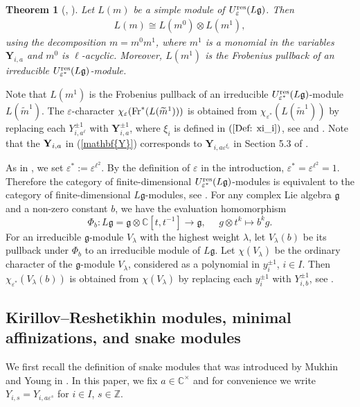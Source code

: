 \documentclass[11pt, reqno]{amsart}
\theoremstyle{plain}
\newtheorem{theorem}{Theorem}[section]
\theoremstyle{definition}
\numberwithin{equation}{section}
\newcommand{\CC}{{\mathbb {C}}}
\newcommand{\res}{{\rm res}}
\begin{document}
\begin{theorem}[{\cite[Theorem 9.1]{CP97}}, {\cite[Theorem 5.4]{FM02}}]\label{Th:decomposition}
Let $L(m)$ be a simple module of $U_\varepsilon^{\res}({L\mathfrak{g}})$. Then
\begin{align*}
L(m)\cong L(m^{0})\otimes L(m^{1}),
\end{align*}
using the decomposition $m=m^{0}m^{1}$, where $m^{1}$ is a monomial in the variables $\mathbf{Y}_{i,a}$ and $m^{0}$ is $\ell$-acyclic. Moreover, $L(m^1)$ is the Frobenius pullback of an irreducible $U_{{\varepsilon}^{\ast}}^{\res}({L\mathfrak{g}})$-module.
\end{theorem}
Note that $L(m^1)$ is the Frobenius pullback of an irreducible $U_{{\varepsilon}^{\ast}}^{\res}({L\mathfrak{g}})$-module $L(\widetilde{m}^1)$. The $\varepsilon$-character $\chi_{\varepsilon}({\rm Fr}^{\ast}(L(\widetilde{m}^1)))$ is obtained from $\chi_{\varepsilon^{\ast}}(L(\widetilde{m}^1))$ by replacing each $Y_{i,a^\ell}^{\pm 1}$ with $\mathbf{Y}_{i,a}^{\pm 1}$, where $\xi_i$ is defined in $(\ref{Def: xi_i})$, see \cite[Theorem 5.7]{FM02} and \cite[Section 3]{Gle16}. Note that the ${\bf Y}_{i,a}$ in (\ref{mathbf{Y}}) corresponds to $\mathbf{Y}_{i,a\varepsilon^{\xi_i}}$ in Section 5.3 of \cite{FM02}. 

As in \cite{FM02}, we set $\varepsilon^{*}:=\varepsilon^{\ell^2}$. By the definition of $\varepsilon$ in the introduction, $\varepsilon^{*}=\varepsilon^{\ell^2} = 1$. Therefore the category of finite-dimensional $U_{{\varepsilon}^{*}}^{\res}({L\mathfrak{g}})$-modules is equivalent to the category of finite-dimensional $L\mathfrak{g}$-modules, see \cite[Section 5.4]{FM02}. For any complex Lie algebra $\mathfrak{g}$ and a non-zero constant $b$, we have the evaluation homomorphism
\[\Phi_b: L{\mathfrak{g}}=\mathfrak{g}\otimes\mathbb{C}[t,t^{-1}]\rightarrow \mathfrak{g},\quad\,\, g\otimes t^k\mapsto b^kg.\]
For an irreducible $\mathfrak{g}$-module $V_{\lambda}$ with the highest weight $\lambda$, let $V_\lambda(b)$ be its pullback under $\Phi_b$ to an irreducible module of $L{\mathfrak{g}}$. Let $\chi(V_\lambda)$ be the ordinary character of the $\mathfrak{g}$-module $V_\lambda$, considered as a polynomial in $y_i^{\pm 1}$, $i\in I$. Then $\chi_{{\varepsilon}^\ast}(V_\lambda(b))$ is obtained from $\chi(V_\lambda)$ by replacing each $y_i^{\pm 1}$ with $Y_{i,b}^{\pm 1}$, see {\cite[Lemma 5.8]{FM02}}.


\subsection{Kirillov--Reshetikhin modules, minimal affinizations, and snake modules }\label{Snake modules} 
We first recall the definition of snake modules that was introduced by Mukhin and Young in \cite{MY12}. In this paper, we fix $a \in \CC^{\times}$ and for convenience we write $Y_{i,s}=Y_{i,a\varepsilon^s}$ for $i \in I$, $s \in \mathbb{Z}$. 
\end{document}
